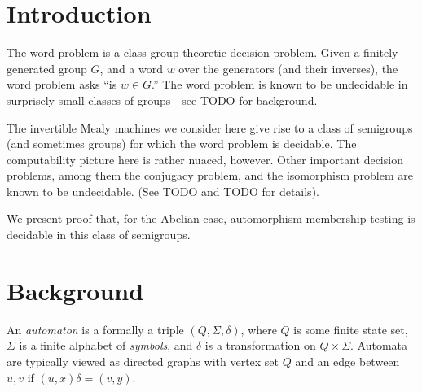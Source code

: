 \documentclass[10pt]{article} %
\newcommand{\defn}[1]{\textit{#1}}
\begin{document}
\pagestyle{plain}
\title{\rmfamily\normalfont{}}
\author{}
\date{May 5, 2017}

\maketitle

\begin{abstract}
We consider a variety of decision problems in groups and semigroups induced by invertible Mealy machines. Notably, we present proof that the automorphism membership problem in decidable in these semigroups. In addition, we prove undecidability of a Knapsack variant. A discussion of iteration and orbit rationality follows.
\end{abstract}

\tableofcontents

\section{Introduction}
The word problem is a class group-theoretic decision problem. Given a finitely generated group $G$, and a word $w$ over the generators (and their inverses), the word problem asks ``is $w \in G$.'' The word problem is known to be undecidable in surprisely small classes of groups - see TODO for background.

The invertible Mealy machines we consider here give rise to a class of semigroups (and sometimes groups) for which the word problem is decidable. The computability picture here is rather nuaced, however. Other important decision problems, among them the conjugacy problem, and the isomorphism problem are known to be undecidable. (See TODO and TODO for details).

We present proof that, for the Abelian case, automorphism membership testing is decidable in this class of semigroups.

\section{Background}
An \defn{automaton} is a formally a triple $(Q, \Sigma, \delta)$, where $Q$ is some finite state set, $\Sigma$ is a finite alphabet of \defn{symbols}, and $\delta$ is a transformation on $Q \times \Sigma$.  Automata are typically viewed as directed graphs with vertex set $Q$ and an edge between $u, v$ if $(u, x)\delta = (v, y)$.
\end{document}
